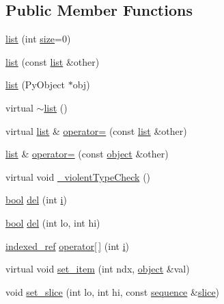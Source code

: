 \subsection*{Public Member Functions}
\begin{DoxyCompactItemize}
\item 
\hyperlink{classpy_1_1list_a8f0fc056faceef321172c1aebaea3f87}{list} (int \hyperlink{classpy_1_1object_a1ad49df7b8f541c1f3d4ff93f582ac61}{size}=0)
\item 
\hyperlink{classpy_1_1list_aea901b7c5c8b6cf05f8b3dc34fc37f04}{list} (const \hyperlink{classpy_1_1list}{list} \&other)
\item 
\hyperlink{classpy_1_1list_a3490b13b5027a5db2d8aa7d178fde41d}{list} (Py\+Object $\ast$obj)
\item 
virtual \hyperlink{classpy_1_1list_ab8eea8a8c3a7fe8c176007b363c47b73}{$\sim$list} ()
\item 
virtual \hyperlink{classpy_1_1list}{list} \& \hyperlink{classpy_1_1list_a8bcf6810762268377714c3b142e50fe2}{operator=} (const \hyperlink{classpy_1_1list}{list} \&other)
\item 
\hyperlink{classpy_1_1list}{list} \& \hyperlink{classpy_1_1list_a055291adc26ae4e3156b43c90b031bca}{operator=} (const \hyperlink{classpy_1_1object}{object} \&other)
\item 
virtual void \hyperlink{classpy_1_1list_ac6699a38b4cff5610c1ed9726892d9da}{\+\_\+violent\+Type\+Check} ()
\item 
\hyperlink{compiler_8h_abb452686968e48b67397da5f97445f5b}{bool} \hyperlink{classpy_1_1list_af6108c6449b5de3bb43d85bdc302c74d}{del} (int \hyperlink{indexexpr_8h_aabd77643995707c185e95c8cb2782c81}{i})
\item 
\hyperlink{compiler_8h_abb452686968e48b67397da5f97445f5b}{bool} \hyperlink{classpy_1_1list_adc61e377901be38cd293d6138d31a46f}{del} (int lo, int hi)
\item 
\hyperlink{classpy_1_1indexed__ref}{indexed\+\_\+ref} \hyperlink{classpy_1_1list_a86e87fee9d012325fabcadff07d2d748}{operator\mbox{[}$\,$\mbox{]}} (int \hyperlink{indexexpr_8h_aabd77643995707c185e95c8cb2782c81}{i})
\item 
virtual void \hyperlink{classpy_1_1list_add94ae495a90cf69eca38c67c1cd64b5}{set\+\_\+item} (int ndx, \hyperlink{classpy_1_1object}{object} \&val)
\item 
void \hyperlink{classpy_1_1list_a475044364fbc0f0bf89bb84b7a9807a8}{set\+\_\+slice} (int lo, int hi, const \hyperlink{classpy_1_1sequence}{sequence} \&\hyperlink{classpy_1_1sequence_a23c8f75fd20de310deff1b7a7465cccc}{slice})

\end{DoxyCompactItemize}
